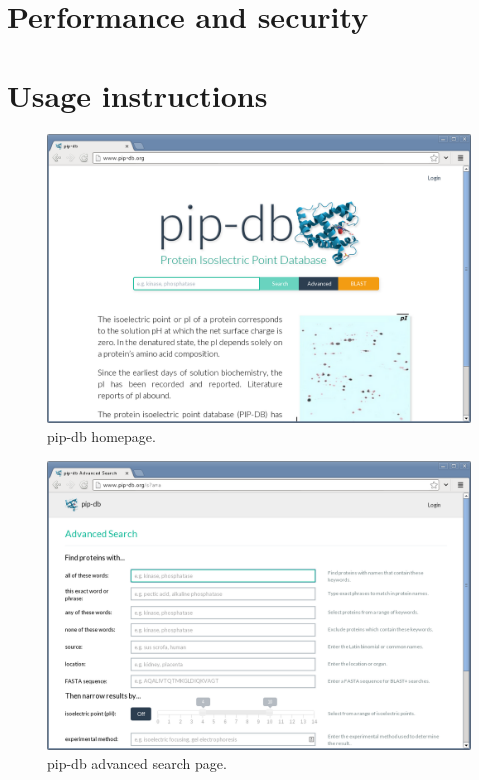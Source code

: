 \section{Performance and security}

\section{Usage instructions}\label{sec:usage-instructions}


\begin{figure}[H]
\centering
    \includegraphics[width=\textwidth]{assets/pip-db}
\caption[pip-db homepage]
        {pip-db homepage.}
\label{fig:pip-db}
\end{figure}


\begin{figure}[H]
\centering
    \includegraphics[width=\textwidth]{assets/pip-db-advanced}
\caption[pip-db advanced search page]
        {pip-db advanced search page.}
\label{fig:pip-db-advanced}
\end{figure}



